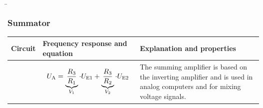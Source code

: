 
\begin{frame}
    \b{
    \frametitle{Summator}
    \centering
    \begin{table}[ht]
    \label{tab:Summierer}
    \begin{tabular}{|m{}|m{}|m{}|}
    \hline
    Circuit & Frequency response and equation & Explanation and properties\\ %
    \hline
    \vspace{0.5cm}
    \centering
    

    &
    \begin{center}
    
\end{center}
\vspace{1ex}
\[
\begin{aligned}
    U_{\textnormal{A}} = \underbrace{\frac{R_3} {R_1}}_{V_1} \cdot U_{\textnormal{E1}} + \underbrace{\frac{R_3} {R_2}}_{V_2} \cdot U_{\textnormal{E2}}
\end{aligned}
\]
    & 
    The summing amplifier is based on the inverting amplifier and is used in analog computers and for mixing voltage signals. \\
    \hline
    \end{tabular}
    \end{table}
    }
\end{frame}


